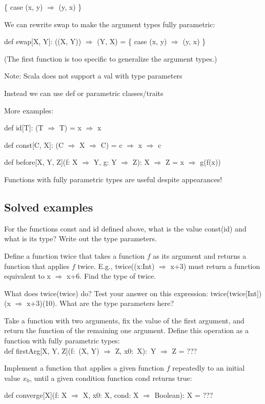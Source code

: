  \{ case (x, y) $\Rightarrow$ (y, x) \} 

We can rewrite swap to make the argument types fully parametric:

def swap{[}X, Y{]}: ((X, Y)) $\Rightarrow$ (Y, X) = \{ case (x, y)
$\Rightarrow$ (y, x) \} 

(The first function is too specific to generalize the argument types.)

Note: Scala does not support a val with type parameters

Instead we can use def or parametric classes/traits

More examples:

def id{[}T{]}: (T $\Rightarrow$ T) = x $\Rightarrow$ x

def const{[}C, X{]}: (C $\Rightarrow$ X $\Rightarrow$ C) = c $\Rightarrow$
x $\Rightarrow$ c

def before{[}X, Y, Z{]}(f: X $\Rightarrow$ Y, g: Y $\Rightarrow$
Z): X $\Rightarrow$ Z = x $\Rightarrow$ g(f(x))

Functions with fully parametric types are useful despite appearances!

\subsection{Solved examples}

For the functions const and id defined above, what is the value const(id)
and what is its type? Write out the type parameters.

Define a function twice that takes a function $f$ as its argument
and returns a function that applies $f$ twice. E.g., twice((x:Int)
$\Rightarrow$ x+3) must return a function equivalent to x $\Rightarrow$
x+6. Find the type of twice.

What does twice(twice) do? Test your answer on this expression: twice(twice{[}Int{]})(x
$\Rightarrow$ x+3)(10). What are the type parameters here?

Take a function with two arguments, fix the value of the first argument,
and return the function of the remaining one argument. Define this
operation as a function with fully parametric types:\\
def firstArg{[}X, Y, Z{]}(f:~(X, Y) $\Rightarrow$ Z, x0:~X):~Y
$\Rightarrow$ Z = ???

Implement a function that applies a given function $f$ repeatedly
to an initial value $x_{0}$, until a given condition function cond
returns true:

def converge{[}X{]}(f: X $\Rightarrow$ X, x0: X, cond: X $\Rightarrow$
Boolean): X = ???

